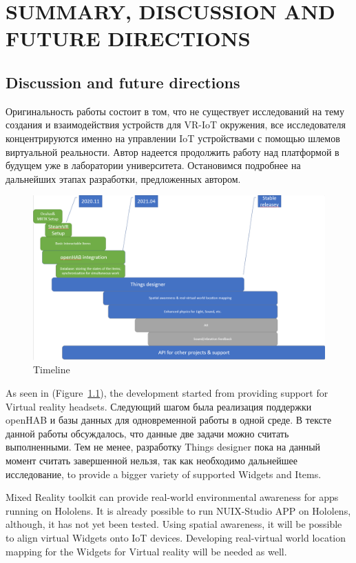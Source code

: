 
\chapter{SUMMARY, DISCUSSION AND FUTURE DIRECTIONS}

\section{Discussion and future directions}

Оригинальность работы состоит в том, что не существует исследований на тему создания и взаимодействия устройств для VR-IoT окружения, все исследователя концентрируются именно на управлении IoT устройствами с помощью шлемов виртуальной реальности.
Автор надеется продолжить работу над платформой в будущем уже в лаборатории университета. Остановимся подробнее на дальнейших этапах разработки, предложенных автором.

\begin{figure}
  \centering
  \includegraphics[width=0.9\linewidth]{figures/Timeline.png}
  \caption{Timeline}
  \label{fig:Timeline-figure}
\end{figure}

As seen in (Figure~\ref{fig:Timeline-figure}), the development started from providing support for Virtual reality headsets. Следующий шагом была реализация поддержки openHAB и базы данных для одновременной работы в одной среде. В тексте данной работы обсуждалось, что данные две задачи можно считать выполненными. Тем не менее, разработку Things designer пока на данный момент считать завершенной нельзя, так как необходимо дальнейшее исследование, to provide a bigger variety of supported Widgets and Items.

Mixed Reality toolkit can provide real-world environmental awareness for apps running on Hololens. It is already possible to run NUIX-Studio APP on Hololens, although, it has not yet been tested. Using spatial awareness, it will be possible to align virtual Widgets onto IoT devices. Developing real-virtual world location mapping for the Widgets for Virtual reality will be needed as well.

